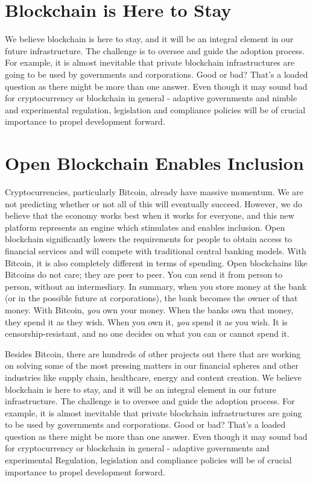 \section*{Blockchain is Here to Stay}
We believe blockchain is here to stay, and it will be an integral element in our future infrastructure. The challenge is to oversee and guide the adoption process. For example, it is almost inevitable that private blockchain infrastructures are going to be used by governments and corporations. Good or bad? That's a loaded question as there might be more than one answer. Even though it may sound bad for cryptocurrency or blockchain in general - adaptive governments and nimble and experimental regulation, legislation and compliance policies will be of crucial importance to propel development forward. 

\section*{Open Blockchain Enables Inclusion}
Cryptocurrencies, particularly Bitcoin, already have massive momentum. We are not predicting whether or not all of this will eventually succeed. However, we do believe that the economy works best when it works for everyone, and this new platform represents an engine which stimulates and enables inclusion. Open blockchain significantly lowers the requirements for people to obtain access to financial services and will compete with traditional central banking models. With Bitcoin, it is also completely different in terms of spending. Open blockchains like Bitcoins do not care; they are peer to peer. You can send it from person to person, without an intermediary. 
In summary, when you store money at the bank (or in the possible future at corporations), the bank becomes the owner of that money. With Bitcoin, \emph{you} own your money. When the banks own that money, they spend it as they wish. When you own it, \emph{you} spend it as you wish. It is censorship-resistant, and no one decides on what you can or cannot spend it.\medskip 

Besides Bitcoin, there are hundreds of other projects out there that are working on solving some of the most pressing matters in our financial spheres and other industries like supply chain, healthcare, energy and content creation. We believe blockchain is here to stay, and it will be an integral element in our future infrastructure.  The challenge is to oversee and guide the adoption process. For example, it is almost inevitable that private blockchain infrastructures are going to be used by governments and corporations.  Good or bad? That's a loaded question as there might be more than one answer.  Even though it may sound bad for cryptocurrency or blockchain in general - adaptive governments and experimental Regulation, legislation and compliance policies will be of crucial importance to propel development forward.

